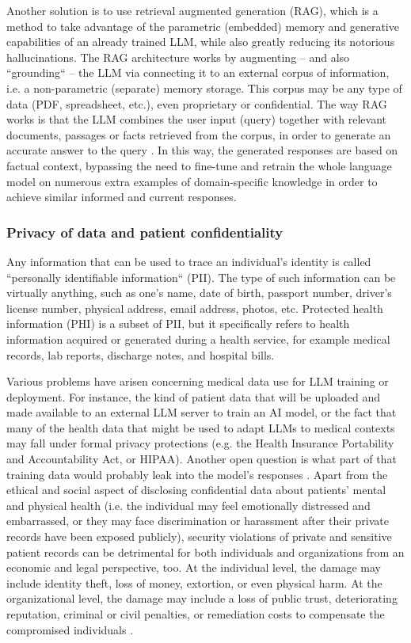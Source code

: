 Another solution is to use retrieval augmented generation (RAG), which is a method to take advantage of the parametric (embedded) memory and generative capabilities of an already trained LLM, while also greatly reducing its notorious hallucinations. The RAG architecture works by augmenting -- and also ``grounding`` -- the LLM via connecting it to an external corpus of information, i.e. a non-parametric (separate) memory storage. This corpus may be any type of data (PDF, spreadsheet, etc.), even proprietary or confidential. The way RAG works is that the LLM combines the user input (query) together with relevant documents, passages or facts retrieved from the corpus, in order to generate an accurate answer to the query \cite{raglewisetal2021}. In this way, the generated responses are based on factual context, bypassing the need to fine-tune and retrain the whole language model on numerous extra examples of domain-specific knowledge in order to achieve similar informed and current responses.

\subsubsection{Privacy of data and patient confidentiality}
Any information that can be used to trace an individual’s identity is called ``personally identifiable information`` (PII). The type of such information can be virtually anything, such as one's name, date of birth, passport number, driver’s license number, physical address, email address, photos, etc. Protected health information (PHI) is a subset of PII, but it specifically refers to health information acquired or generated during a health service, for example medical records, lab reports, discharge notes, and hospital bills. 

Various problems have arisen concerning medical data use for LLM training or deployment. For instance, the kind of patient data that will be uploaded and made available to an external LLM server to train an AI model, or the fact that many of the health data that might be used to adapt LLMs to medical contexts may fall under formal privacy protections (e.g. the Health Insurance Portability and Accountability Act, or HIPAA). Another open question is what part of that training data would probably leak into the model's responses \cite{opportunitiesrisks2024}. Apart from the ethical and social aspect of disclosing confidential data about patients' mental and physical health (i.e. the individual may feel emotionally distressed and embarrassed, or they may face discrimination or harassment after their private records have been exposed publicly), security violations of private and sensitive patient records can be detrimental for both individuals and organizations from an economic and legal perspective, too. At the individual level, the damage may include identity theft, loss of money, extortion, or even physical harm. At the organizational level, the damage may include a loss of public trust, deteriorating reputation, criminal or civil penalties, or remediation costs to compensate the compromised individuals \cite{nist}.

